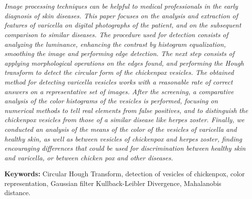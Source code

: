 \chapter*{\runtitle}

\small

\emph{
Image processing techniques can be helpful to medical professionals in the early diagnosis of skin diseases. This paper focuses on the analysis and extraction of features of varicella on digital photographs of the patient, and on the subsequent comparison to similar diseases.
The procedure used for detection consists of analyzing the luminance, enhancing the contrast by histogram equalization, smoothing the image and performing edge detection. The next step consists of applying morphological operations on the edges found, and performing the Hough transform to detect the circular form of the chickenpox vesicles. The obtained method for detecting varicella vesicles works with a reasonable rate of correct answers on a representative set of images.
After the screening, a comparative analysis of the color histograms of the vesicles is performed, focusing on numerical methods to tell real elements from false positives, and to distinguish the chickenpox vesicles from those of a similar disease like herpes zoster.
Finally, we conducted an analysis of the means of the color of the vesicles of varicella and healthy skin, as well as between vesicles of chickenpox and herpes zoster, finding encouraging differences that could be used for discrimination between healthy skin and varicella, or between chicken pox and other diseases.
}
\bigskip

\noindent\textbf{Keywords:} Circular Hough Transform, detection of vesicles of chickenpox, color representation, Gaussian filter Kullback-Leibler Divergence, Mahalanobis distance.
